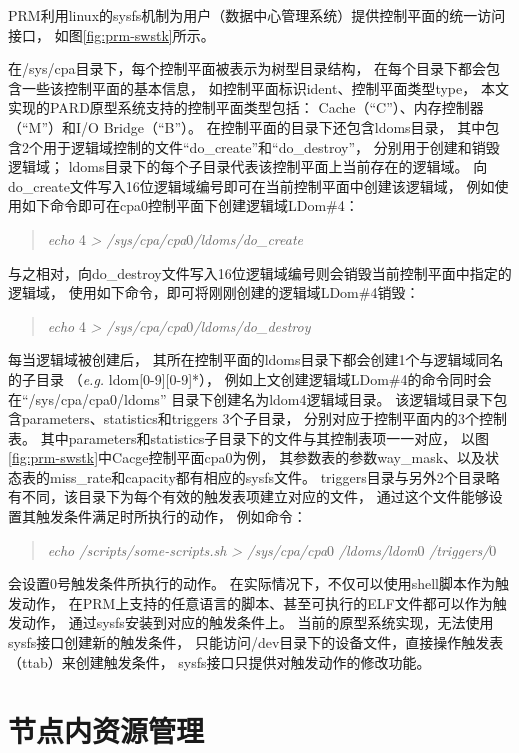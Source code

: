 PRM利用linux的sysfs机制为用户（数据中心管理系统）提供控制平面的统一访问接口，
如图\ref{fig:prm-swstk}所示。

在/sys/cpa目录下，每个控制平面被表示为树型目录结构，
在每个目录下都会包含一些该控制平面的基本信息，
如控制平面标识ident、控制平面类型type，
本文实现的PARD原型系统支持的控制平面类型包括：
Cache（``C''）、内存控制器（``M''）和I/O Bridge（``B''）。
在控制平面的目录下还包含ldoms目录，
其中包含2个用于逻辑域控制的文件``do\_create''和``do\_destroy''，
分别用于创建和销毁逻辑域；
ldoms目录下的每个子目录代表该控制平面上当前存在的逻辑域。
向do\_create文件写入16位逻辑域编号即可在当前控制平面中创建该逻辑域，
例如使用如下命令即可在cpa0控制平面下创建逻辑域LDom\#4：
\begin{verse}
\textit{echo} 4 \textit{> /sys/cpa/cpa}0\textit{/ldoms/do\_create}
\end{verse}
与之相对，向do\_destroy文件写入16位逻辑域编号则会销毁当前控制平面中指定的逻辑域，
使用如下命令，即可将刚刚创建的逻辑域LDom\#4销毁：
\begin{verse}
\textit{echo} 4 \textit{> /sys/cpa/cpa}0\textit{/ldoms/do\_destroy}
\end{verse}

每当逻辑域被创建后，
其所在控制平面的ldoms目录下都会创建1个与逻辑域同名的子目录
（\textit{e.g.} ldom[0-9][0-9]*），
例如上文创建逻辑域LDom\#4的命令同时会在``/sys/cpa/cpa0/ldoms''
目录下创建名为ldom4逻辑域目录。
该逻辑域目录下包含parameters、statistics和triggers 3个子目录，
分别对应于控制平面内的3个控制表。
其中parameters和statistics子目录下的文件与其控制表项一一对应，
以图\ref{fig:prm-swstk}中Cacge控制平面cpa0为例，
其参数表的参数way\_mask、以及状态表的miss\_rate和capacity都有相应的sysfs文件。
triggers目录与另外2个目录略有不同，该目录下为每个有效的触发表项建立对应的文件，
通过这个文件能够设置其触发条件满足时所执行的动作，
例如命令：
\begin{verse}
\textit{echo /scripts/some-scripts.sh > /sys/cpa/cpa}0
\textit{/ldoms/ldom}0
\textit{/triggers/}0
\end{verse}
会设置0号触发条件所执行的动作。
在实际情况下，不仅可以使用shell脚本作为触发动作，
在PRM上支持的任意语言的脚本、甚至可执行的ELF文件都可以作为触发动作，
通过sysfs安装到对应的触发条件上。
当前的原型系统实现，无法使用sysfs接口创建新的触发条件，
只能访问/dev目录下的设备文件，直接操作触发表（ttab）来创建触发条件，
sysfs接口只提供对触发动作的修改功能。


\section{节点内资源管理}

